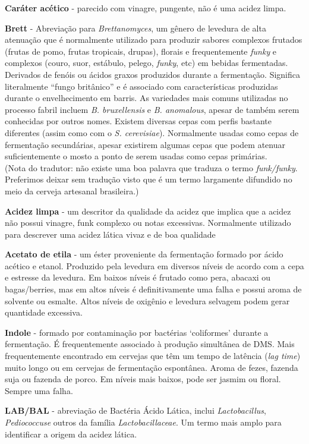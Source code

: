\textbf{Caráter acético} - parecido com vinagre, pungente, não é uma acidez limpa.

\textbf{Brett} - Abreviação para \textit{Brettanomyces}, um gênero de levedura de alta atenuação que é normalmente utilizado para produzir sabores complexos frutados (frutas de pomo, frutas tropicais, drupas), florais e frequentemente \textit{funky} e complexos (couro, suor, estábulo, pelego, \textit{funky}, etc) em bebidas fermentadas. Derivados de fenóis ou ácidos graxos produzidos durante a fermentação. Significa literalmente “fungo britânico” e é associado com características produzidas durante o envelhecimento em barris.
As variedades mais comuns utilizadas no processo fabril incluem \textit{B. bruxellensis} e \textit{B. anomalous}, apesar de também serem conhecidas por outros nomes. Existem diversas cepas com perfis bastante diferentes (assim como com o \textit{S. cerevisiae}).  Normalmente usadas como cepas de fermentação secundárias, apesar existirem algumas cepas que podem atenuar suficientemente o mosto a ponto de serem usadas como cepas primárias.\\
(Nota do tradutor: não existe uma boa palavra que traduza o termo \textit{funk/funky}. Preferimos deixar sem tradução visto que é um termo largamente difundido no meio da cerveja artesanal brasileira.)

\textbf{Acidez limpa} - um descritor da qualidade da acidez que implica que a acidez não possui vinagre, funk complexo ou notas excessivas. Normalmente utilizado para descrever uma acidez lática vivaz e de boa qualidade

\textbf{Acetato de etila} - um éster proveniente da fermentação formado por ácido acético e etanol. Produzido pela levedura em diversos níveis de acordo com a cepa e estresse da levedura. Em baixos níveis é frutado como pera, abacaxi ou bagas/berries, mas em altos níveis é definitivamente uma falha e possui aroma de solvente ou esmalte. Altos níveis de oxigênio e levedura selvagem podem gerar quantidade excessiva.

\textbf{Indole} - formado por contaminação por bactérias ‘coliformes’ durante a fermentação. É frequentemente associado à produção simultânea de DMS. Mais frequentemente encontrado em cervejas que têm um tempo de latência (\textit{lag time}) muito longo ou em cervejas de fermentação espontânea. Aroma de fezes, fazenda suja ou fazenda de porco. Em níveis mais baixos, pode ser jasmim ou floral. Sempre uma falha.

\textbf{LAB/BAL} - abreviação de Bactéria Ácido Lática, inclui \textit{Lactobacillus}, \textit{Pediococcuse} outros da família \textit{Lactobacillaceae}. Um termo mais amplo para identificar a origem da acidez lática.

